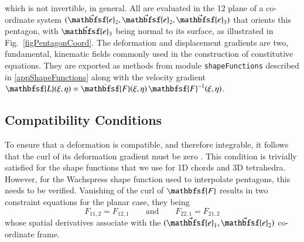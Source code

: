 which is not invertible, in general.  All are evaluated in the 12 plane of a co-ordinate system $( \vec{\mathbfsf{e}}_2 , \vec{\mathbfsf{e}}_2 , \vec{\mathbfsf{e}}_3 )$ that orients this pentagon, with $\vec{\mathbfsf{e}}_3$ being normal to its surface, as illustrated in Fig.~\ref{figPentagonCoord}.  The deformation and displacement gradients are two, fundamental, kinematic fields commonly used in the construction of constitutive equations.  They are exported as methods from module \texttt{shapeFunctions} described in \ref{appShapeFunctions} along with the velocity gradient $\mathbfsf{L} (\xi, \eta) = \dot{\mathbfsf{F}} (\xi, \eta) \, \mathbfsf{F}^{-1} (\xi, \eta)$.

\subsection{Compatibility Conditions}

To ensure that a deformation is compatible, and therefore integrable, it follows that the curl of its deformation gradient must be zero \cite{Clayton15}.  This condition is trivially satisfied for the shape functions that we use for 1D chords and 3D tetrahedra.  However, for the Wachspress shape function used to interpolate pentagons, this needs to be verified.  Vanishing of the curl of $\mathbfsf{F}$ results in two constraint equations for the planar case, they being
\begin{equation}
\label{compatibility}
F_{11,2} = F_{12,1} 
\qquad \text{and} \qquad
F_{22,1} = F_{21,2}
\end{equation}
whose spatial derivatives associate with the $( \vec{\mathbfsf{e}}_1 , \vec{\mathbfsf{e}}_2 )$ co-ordinate frame.

